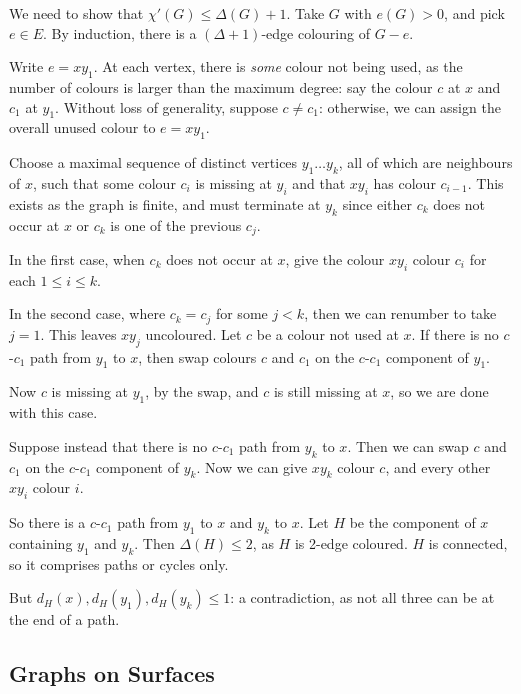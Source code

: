 \documentclass{article}
\begin{document}
\begin{prf}
    We need to show that $\chi'(G) \leq \Delta(G) + 1$. Take $G$ with $e(G) > 0$, and pick $e \in E$. By induction, there is a $(\Delta + 1)$-edge colouring of $G-e$.
    
    Write $e = xy_1$. At each vertex, there is \textit{some} colour not being used, as the number of colours is larger than the maximum degree: say the colour $c$ at $x$ and $c_1$ at $y_1$. Without loss of generality, suppose $c \neq c_1$: otherwise, we can assign the overall unused colour to $e = xy_1$.
    
    Choose a maximal sequence of distinct vertices $y_1 \dots y_k$, all of which are neighbours of $x$, such that some colour $c_i$ is missing at $y_i$ and that $xy_i$ has colour $c_{i-1}$. This exists as the graph is finite, and must terminate at $y_k$ since either $c_k$ does not occur at $x$ or $c_k$ is one of the previous $c_j$.
    
    In the first case, when $c_k$ does not occur at $x$, give the colour $xy_i$ colour $c_i$ for each $1 \leq i \leq k$.
    
    In the second case, where $c_k = c_j$ for some $j < k$, then we can renumber to take $j = 1$. This leaves $xy_j$ uncoloured. Let $c$ be a colour not used at $x$. If there is no $c$-$c_1$ path from $y_1$ to $x$, then swap colours $c$ and $c_1$ on the $c$-$c_1$ component of $y_1$.
    
    Now $c$ is missing at $y_1$, by the swap, and $c$ is still missing at $x$, so we are done with this case.
    
    Suppose instead that there is no $c$-$c_1$ path from $y_k$ to $x$. Then we can swap $c$ and $c_1$ on the $c$-$c_1$ component of $y_k$. Now we can give $xy_k$ colour $c$, and every other $xy_i$ colour $i$.
    
    So there is a $c$-$c_1$ path from $y_1$ to $x$ and $y_k$ to $x$. Let $H$ be the component of $x$ containing $y_1$ and $y_k$. Then $\Delta(H) \leq 2$, as $H$ is 2-edge coloured. $H$ is connected, so it comprises paths or cycles only.
    
    But $d_H(x), d_H(y_1), d_H(y_k) \leq 1$: a contradiction, as not all three can be at the end of a path.
\end{prf}


\subsection{Graphs on Surfaces}
\end{document}
